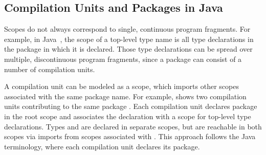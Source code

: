 % 

\subsection{Compilation Units and Packages in Java}

Scopes do not always correspond to single, continuous program fragments.
For example, in Java~\cite{JLS8}, 
  the scope of a top-level type name is all type declarations in the package in which it is declared.
Those type declarations can be spread over multiple, discontinuous program fragments,
  since a package can consist of a number of compilation units.

A compilation unit can be modeled as a scope,
  which imports other scopes associated with the same package name.
For example, 
   shows two compilation units contributing to the same package .
Each compilation unit declares package  in the root scope
  and associates the declaration with a scope for top-level type declarations.
Types  and  are declared in separate scopes, 
  but are reachable in both scopes via imports from scopes associated with .
This approach follows the Java terminology, where each compilation unit declares its package.


